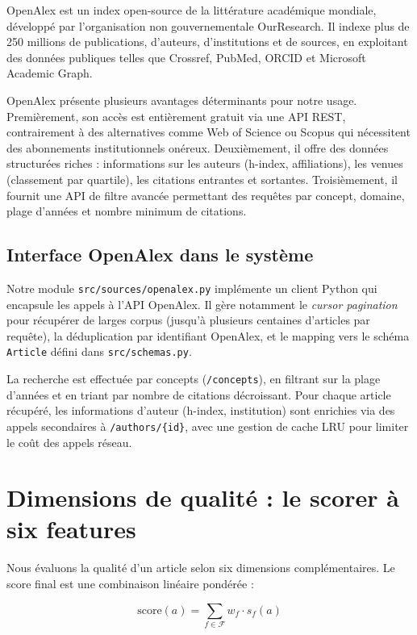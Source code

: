 OpenAlex \cite{priem2022openalex} est un index open-source de la littérature
académique mondiale, développé par l'organisation non gouvernementale OurResearch.
Il indexe plus de 250 millions de publications, d'auteurs, d'institutions
et de sources, en exploitant des données publiques telles que Crossref,
PubMed, ORCID et Microsoft Academic Graph.

OpenAlex présente plusieurs avantages déterminants pour notre usage.
Premièrement, son accès est entièrement gratuit via une API REST, contrairement
à des alternatives comme Web of Science ou Scopus qui nécessitent des abonnements
institutionnels onéreux. Deuxièmement, il offre des données structurées riches :
informations sur les auteurs (h-index, affiliations), les venues (classement
par quartile), les citations entrantes et sortantes. Troisièmement, il fournit
une API de filtre avancée permettant des requêtes par concept, domaine,
plage d'années et nombre minimum de citations.

\subsection{Interface OpenAlex dans le système}

Notre module \texttt{src/sources/openalex.py} implémente un client Python
qui encapsule les appels à l'API OpenAlex. Il gère notamment le \textit{cursor
pagination} pour récupérer de larges corpus (jusqu'à plusieurs centaines
d'articles par requête), la déduplication par identifiant OpenAlex,
et le mapping vers le schéma \texttt{Article} défini dans \texttt{src/schemas.py}.

La recherche est effectuée par concepts (\texttt{/concepts}),
en filtrant sur la plage d'années et en triant par nombre de citations
décroissant. Pour chaque article récupéré, les informations d'auteur
(h-index, institution) sont enrichies via des appels secondaires à
\texttt{/authors/\{id\}}, avec une gestion de cache LRU pour limiter
le coût des appels réseau.

\section{Dimensions de qualité : le scorer à six features}
\label{sec:scoring_features}

Nous évaluons la qualité d'un article selon six dimensions complémentaires.
Le score final est une combinaison linéaire pondérée :

\begin{equation}
  \text{score}(a) = \sum_{f \in \mathcal{F}} w_f \cdot s_f(a)
  \label{eq:weighted_score}
\end{equation}

